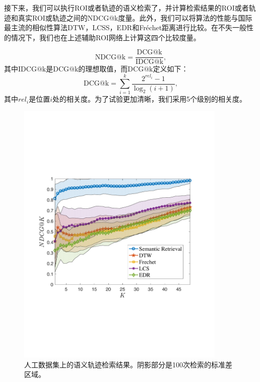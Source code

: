 接下来，我们可以执行ROI或者轨迹的语义检索了，并计算检索结果的ROI或者轨迹和真实ROI或轨迹之间的NDCG@k度量。此外，我们可以将算法的性能与国际最主流的相似性算法DTW，LCSS，EDR和Fr\'echet距离进行比较。在不失一般性的情况下，我们也在上述辅助ROI网络上计算这四个比较度量。


\begin{equation}
\mathrm{NDCG@k} = \frac{\mathrm{DCG@k}}{\mathrm{IDCG@k}},
\label{eq:NDCG}
\end{equation}
其中$\mathrm{IDCG@k}$是$\mathrm{DCG@k}$的理想取值，而$\mathrm{DCG@k}$定义如下：
\begin{equation}
\mathrm{DCG@{k}} = \sum_{i=1}^{k} \frac{ 2^{rel_{i}} - 1 }{ \log_{2}(i+1)},
\label{eq:DCG}
\end{equation}
其中$rel_i$是位置$i$处的相关度。为了试验更加清晰，我们采用5个级别的相关度。

\tabcolsep=0.5pt
\begin{figure}[!b]
\centering
\includegraphics[width=100mm]{pics/synNDCG.pdf}
\caption{人工数据集上的语义轨迹检索结果。阴影部分是100次检索的标准差区域。}
\label{fig:synNDCG}
\end{figure}



